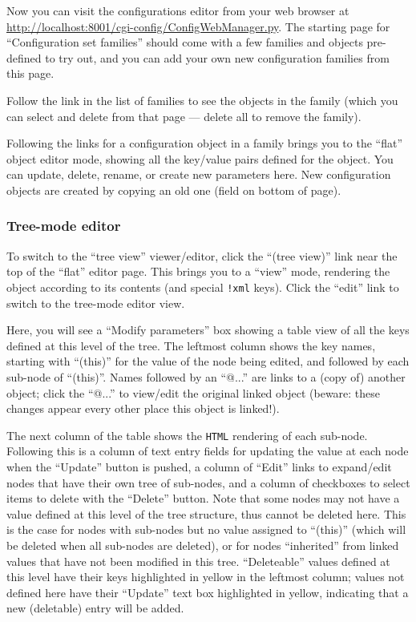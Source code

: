 \documentclass[12pt,english]{article}
\newcommand{\cd}[1]{\texttt{#1}}
\begin{document}
Now you can visit the configurations editor from your web browser at
	\url{http://localhost:8001/cgi-config/ConfigWebManager.py}.
The starting page for ``Configuration set families'' should come with a few families
	and objects pre-defined to try out,
	and you can add your own new configuration families from this page.

Follow the link in the list of families to see the objects in the family
	(which you can select and delete from that page --- delete all to remove the family).

Following the links for a configuration object in a family brings you to the ``flat'' object editor mode,
	showing all the key/value pairs defined for the object.
You can update, delete, rename, or create new parameters here.
New configuration objects are created by copying an old one (field on bottom of page).

%
\subsubsection{Tree-mode editor}

To switch to the ``tree view'' viewer/editor, click the ``(tree view)'' link near the top of the ``flat'' editor page.
This brings you to a ``view'' mode, rendering the object according to its contents (and special \cd{!xml} keys).
Click the ``edit'' link to switch to the tree-mode editor view.

Here, you will see a ``Modify parameters'' box showing a table view of all the keys defined
	at this level of the tree.
The leftmost column shows the key names, starting with ``(this)'' for the value of the node being edited,
	and followed by each sub-node of ``(this)''.
Names followed by an ``@...'' are links to a (copy of) another object;
	click the ``@...'' to view/edit the original linked object (beware: these changes appear every other place this object is linked!).

The next column of the table shows the \cd{HTML} rendering of each sub-node.
Following this is a column of text entry fields for updating the value
	at each node when the ``Update'' button is pushed,
	a column of ``Edit'' links to expand/edit nodes that have their own tree of sub-nodes,
	and a column of checkboxes to select items to delete with the ``Delete'' button.
Note that some nodes may not have a value defined at this level of the tree structure,
	thus cannot be deleted here.
This is the case for nodes with sub-nodes but no value assigned to ``(this)'' (which will be deleted when all sub-nodes are deleted),
	or for nodes ``inherited'' from linked values that have not been modified in this tree.
``Deleteable'' values defined at this level have their keys highlighted in yellow in the leftmost column;
	values not defined here have their ``Update'' text box highlighted in yellow,
	indicating that a new (deletable) entry will be added.
\end{document}
